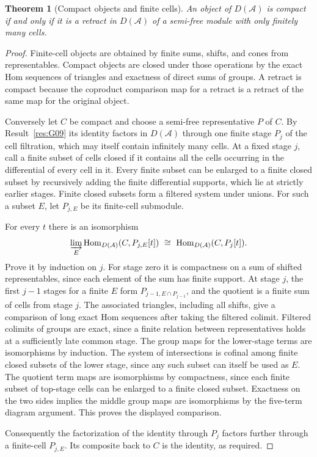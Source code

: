 \documentclass[11pt,oneside,openany]{book}
\newtheorem{theorem}{Theorem}[chapter]
\theoremstyle{definition}
\theoremstyle{remark}
\begin{document}
\begin{theorem}[Compact objects and finite cells]\label{res:G11}
An object of \(D(\mathcal A)\) is compact if and only if it is
a retract in \(D(\mathcal A)\) of a semi-free module with only
finitely many cells.
\end{theorem}
\begin{proof}
Finite-cell objects are obtained by finite sums, shifts, and
cones from representables. Compact objects are closed under
those operations by the exact Hom sequences of triangles and
exactness of direct sums of groups. A retract is compact because
the coproduct comparison map for a retract is a retract of the
same map for the original object.

Conversely let \(C\) be compact and choose a semi-free
representative \(P\) of \(C\). By Result~\ref{res:G09} its identity
factors in \(D(\mathcal A)\) through one finite stage \(P_j\) of
the cell filtration, which may itself contain infinitely many
cells. At a fixed stage \(j\), call a finite subset of cells
closed if it contains all the cells occurring in the differential of
every cell in it. Every finite subset can be enlarged to a finite
closed subset by recursively adding the finite differential
supports, which lie at strictly earlier stages. Finite closed
subsets form a filtered system under unions. For such a subset
\(E\), let \(P_{j,E}\) be its finite-cell submodule.

For every \(t\) there is an isomorphism
\[
 \varinjlim_E\operatorname{Hom}_{D(\mathcal A)}(C,P_{j,E}[t])
     \ \cong\ \operatorname{Hom}_{D(\mathcal A)}(C,P_j[t]).
\]
Prove it by induction on \(j\). For stage zero it is compactness
on a sum of shifted representables, since each element of the sum
has finite support. At stage \(j\), the first \(j-1\) stages for a
finite \(E\) form \(P_{j-1,E\cap P_{j-1}}\), and the quotient is a
finite sum of cells from stage \(j\). The associated triangles,
including all shifts, give a comparison of long exact Hom sequences
after taking the filtered colimit. Filtered colimits of groups
are exact, since a finite relation between representatives holds
at a sufficiently late common stage. The group maps for the
lower-stage terms are isomorphisms by induction. The system of
intersections is cofinal among finite closed subsets of the
lower stage, since any such subset can itself be used as \(E\).
The quotient term maps are isomorphisms by compactness, since
each finite subset of top-stage cells can be enlarged to a finite
closed subset. Exactness on the two sides implies the middle
group maps are isomorphisms by the five-term diagram argument.
This proves the displayed comparison.

Consequently the factorization of the identity through \(P_j\)
factors further through a finite-cell \(P_{j,E}\). Its composite
back to \(C\) is the identity, as required.
\end{proof}
\end{document}
